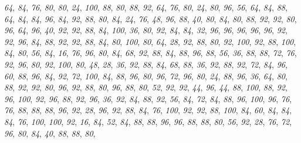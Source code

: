 \documentclass[
]{article}
\begin{document}
\emph{64}, \emph{84}, \emph{76}, \emph{80}, \emph{80}, \emph{24},
\emph{100}, \emph{88}, \emph{80}, \emph{88}, \emph{92}, \emph{64},
\emph{76}, \emph{80}, \emph{24}, \emph{80}, \emph{96}, \emph{56},
\emph{64}, \emph{84}, \emph{88}, \emph{64}, \emph{84}, \emph{84},
\emph{96}, \emph{84}, \emph{92}, \emph{88}, \emph{80}, \emph{84},
\emph{24}, \emph{76}, \emph{48}, \emph{96}, \emph{88}, \emph{40},
\emph{80}, \emph{84}, \emph{80}, \emph{88}, \emph{92}, \emph{92},
\emph{80}, \emph{96}, \emph{64}, \emph{96}, \emph{40}, \emph{92},
\emph{92}, \emph{88}, \emph{84}, \emph{100}, \emph{36}, \emph{80},
\emph{92}, \emph{84}, \emph{84}, \emph{32}, \emph{96}, \emph{96},
\emph{96}, \emph{96}, \emph{96}, \emph{92}, \emph{92}, \emph{96},
\emph{84}, \emph{88}, \emph{92}, \emph{92}, \emph{88}, \emph{84},
\emph{80}, \emph{100}, \emph{80}, \emph{64}, \emph{28}, \emph{92},
\emph{88}, \emph{80}, \emph{92}, \emph{100}, \emph{92}, \emph{88},
\emph{100}, \emph{84}, \emph{80}, \emph{56}, \emph{84}, \emph{16},
\emph{76}, \emph{96}, \emph{80}, \emph{84}, \emph{68}, \emph{92},
\emph{88}, \emph{84}, \emph{88}, \emph{96}, \emph{88}, \emph{56},
\emph{36}, \emph{88}, \emph{88}, \emph{72}, \emph{76}, \emph{92},
\emph{96}, \emph{80}, \emph{92}, \emph{100}, \emph{80}, \emph{48},
\emph{28}, \emph{36}, \emph{92}, \emph{88}, \emph{84}, \emph{68},
\emph{88}, \emph{36}, \emph{92}, \emph{88}, \emph{92}, \emph{72},
\emph{84}, \emph{96}, \emph{60}, \emph{88}, \emph{96}, \emph{84},
\emph{92}, \emph{72}, \emph{100}, \emph{84}, \emph{88}, \emph{96},
\emph{80}, \emph{96}, \emph{72}, \emph{96}, \emph{80}, \emph{24},
\emph{88}, \emph{96}, \emph{36}, \emph{64}, \emph{80}, \emph{88},
\emph{92}, \emph{92}, \emph{80}, \emph{96}, \emph{92}, \emph{88},
\emph{80}, \emph{96}, \emph{88}, \emph{80}, \emph{52}, \emph{92},
\emph{92}, \emph{44}, \emph{96}, \emph{44}, \emph{88}, \emph{100},
\emph{88}, \emph{92}, \emph{96}, \emph{100}, \emph{92}, \emph{96},
\emph{88}, \emph{92}, \emph{96}, \emph{36}, \emph{92}, \emph{84},
\emph{88}, \emph{92}, \emph{56}, \emph{84}, \emph{72}, \emph{84},
\emph{88}, \emph{96}, \emph{100}, \emph{96}, \emph{76}, \emph{76},
\emph{88}, \emph{88}, \emph{88}, \emph{96}, \emph{92}, \emph{28},
\emph{96}, \emph{92}, \emph{88}, \emph{84}, \emph{76}, \emph{100},
\emph{92}, \emph{92}, \emph{88}, \emph{100}, \emph{84}, \emph{60},
\emph{84}, \emph{84}, \emph{84}, \emph{76}, \emph{100}, \emph{100},
\emph{92}, \emph{16}, \emph{84}, \emph{52}, \emph{84}, \emph{88},
\emph{88}, \emph{96}, \emph{96}, \emph{88}, \emph{88}, \emph{80},
\emph{56}, \emph{92}, \emph{28}, \emph{76}, \emph{72}, \emph{96},
\emph{80}, \emph{84}, \emph{40}, \emph{88}, \emph{88}, \emph{80},
\end{document}
